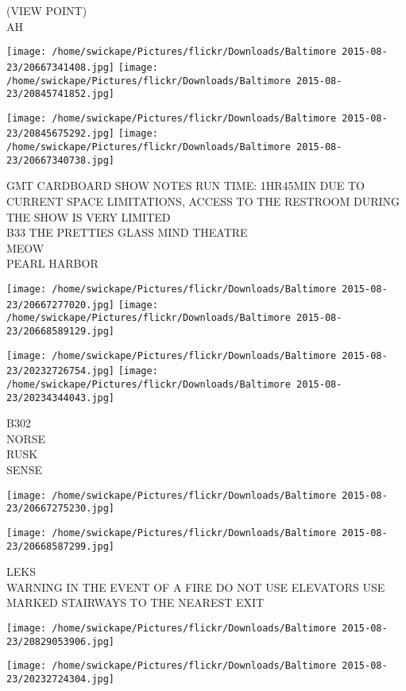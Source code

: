 \documentclass[10pt,letterpaper]{article}
\begin{document}
(VIEW POINT)\\
AH
\pagebreak

\texttt{[image: /home/swickape/Pictures/flickr/Downloads/Baltimore 2015-08-23/20667341408.jpg]}
\texttt{[image: /home/swickape/Pictures/flickr/Downloads/Baltimore 2015-08-23/20845741852.jpg]}

\texttt{[image: /home/swickape/Pictures/flickr/Downloads/Baltimore 2015-08-23/20845675292.jpg]}
\texttt{[image: /home/swickape/Pictures/flickr/Downloads/Baltimore 2015-08-23/20667340738.jpg]}

GMT CARDBOARD SHOW NOTES RUN TIME: 1HR45MIN DUE TO CURRENT SPACE LIMITATIONS, ACCESS TO THE RESTROOM DURING THE SHOW IS VERY LIMITED\\
B33 THE PRETTIES GLASS MIND THEATRE\\
MEOW\\
PEARL HARBOR
\pagebreak

\texttt{[image: /home/swickape/Pictures/flickr/Downloads/Baltimore 2015-08-23/20667277020.jpg]}
\texttt{[image: /home/swickape/Pictures/flickr/Downloads/Baltimore 2015-08-23/20668589129.jpg]}

\texttt{[image: /home/swickape/Pictures/flickr/Downloads/Baltimore 2015-08-23/20232726754.jpg]}
\texttt{[image: /home/swickape/Pictures/flickr/Downloads/Baltimore 2015-08-23/20234344043.jpg]}

B302\\
NORSE\\
RUSK\\
SENSE
\pagebreak

\texttt{[image: /home/swickape/Pictures/flickr/Downloads/Baltimore 2015-08-23/20667275230.jpg]}

\vspace{0.25in}
\texttt{[image: /home/swickape/Pictures/flickr/Downloads/Baltimore 2015-08-23/20668587299.jpg]}

LEKS\\
WARNING IN THE EVENT OF A FIRE DO NOT USE ELEVATORS USE MARKED STAIRWAYS TO THE NEAREST EXIT
\pagebreak

\texttt{[image: /home/swickape/Pictures/flickr/Downloads/Baltimore 2015-08-23/20829053906.jpg]}

\vspace{0.25in}
\texttt{[image: /home/swickape/Pictures/flickr/Downloads/Baltimore 2015-08-23/20232724304.jpg]}
\end{document}
